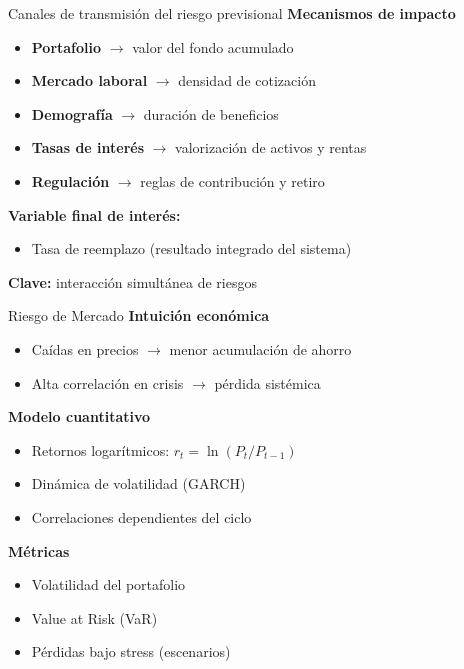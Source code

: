 \documentclass{beamer}
\begin{document}
\begin{frame}{Canales de transmisión del riesgo previsional}
\textbf{Mecanismos de impacto}

\begin{itemize}
\item \textbf{Portafolio} $\rightarrow$ valor del fondo acumulado
\item \textbf{Mercado laboral} $\rightarrow$ densidad de cotización
\item \textbf{Demografía} $\rightarrow$ duración de beneficios
\item \textbf{Tasas de interés} $\rightarrow$ valorización de activos y rentas
\item \textbf{Regulación} $\rightarrow$ reglas de contribución y retiro
\end{itemize}

\vspace{0.3cm}
\textbf{Variable final de interés:}
\begin{itemize}
\item Tasa de reemplazo (resultado integrado del sistema)
\end{itemize}

\vspace{0.2cm}
\textbf{Clave:} interacción simultánea de riesgos
\end{frame}

\begin{frame}{Riesgo de Mercado}
\textbf{Intuición económica}
\begin{itemize}
\item Caídas en precios $\rightarrow$ menor acumulación de ahorro
\item Alta correlación en crisis $\rightarrow$ pérdida sistémica
\end{itemize}

\vspace{0.3cm}
\textbf{Modelo cuantitativo}
\begin{itemize}
\item Retornos logarítmicos: $r_t = \ln(P_t/P_{t-1})$
\item Dinámica de volatilidad (GARCH)
\item Correlaciones dependientes del ciclo
\end{itemize}

\vspace{0.3cm}
\textbf{Métricas}
\begin{itemize}
\item Volatilidad del portafolio
\item Value at Risk (VaR)
\item Pérdidas bajo stress (escenarios)
\end{itemize}
\end{frame}
\end{document}
